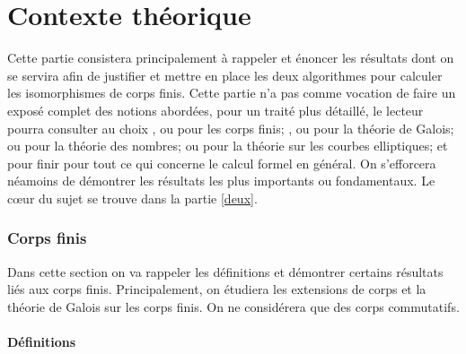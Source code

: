 \documentclass[a4paper]{article} %
\numberwithin{section}{part}
\numberwithin{equation}{section}
\begin{document}
\part{Contexte théorique}

Cette partie consistera principalement à rappeler et énoncer les résultats dont
on se servira afin de justifier et mettre en place les deux algorithmes pour
calculer les isomorphismes de corps finis. Cette partie n'a pas comme vocation
de faire un exposé complet des notions abordées, pour un traité plus détaillé,
le lecteur pourra consulter au choix \cite{LiNi}, \cite{MuPa} ou 
\cite[chap.~III]{Per} pour les corps finis; \cite{Nek}, \cite[chap.~VIII]{Pol}
ou \cite[chap. VI]{Sam} pour la théorie de Galois; \cite{Sam} ou \cite{Wash1}
pour la théorie des nombres; \cite{Sil} ou \cite{Wash2} pour la théorie sur les
courbes elliptiques; et pour finir \cite{GaGe} pour tout ce qui concerne le 
calcul formel en général. On s'efforcera néamoins de démontrer les résultats les
plus importants ou fondamentaux. Le c\oe ur du sujet se trouve dans la partie 
\ref{deux}.

\section{Corps finis}
Dans cette section on va rappeler les définitions et démontrer certains 
résultats liés aux corps finis. Principalement, on étudiera les extensions 
de corps et la théorie de Galois sur les corps finis. On ne considérera
que des corps commutatifs.

\subsection{Définitions}
\end{document}
